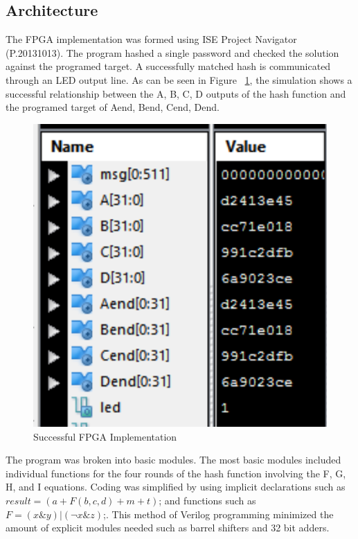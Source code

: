 \documentclass[journal]{IEEEtran}
\begin{document}
\subsection{Architecture}
The FPGA implementation was formed using ISE Project Navigator (P.20131013). The program hashed a single password and checked the solution against the programed target. A successfully matched hash is communicated through an LED output line.  As can be seen in Figure ~\ref{fpga}, the simulation shows a successful relationship between the A, B, C, D outputs of the hash function and the programed target of Aend, Bend, Cend, Dend.

\begin{figure}[H]
	\centering
	\includegraphics[scale=.30]{fpga.png}
	\caption{Successful FPGA Implementation}
	\label{fpga}
\end{figure}

The program was broken into basic modules. The most basic modules included individual functions for the four rounds of the hash function involving the F, G, H, and I equations. Coding was simplified by using implicit declarations such as $result = (a + F(b,c,d) + m + t)$; and functions such as $F = (x\&y)|(\neg x\&z)$;. This method of Verilog programming minimized the amount of explicit modules needed such as barrel shifters and 32 bit adders.
\end{document}
